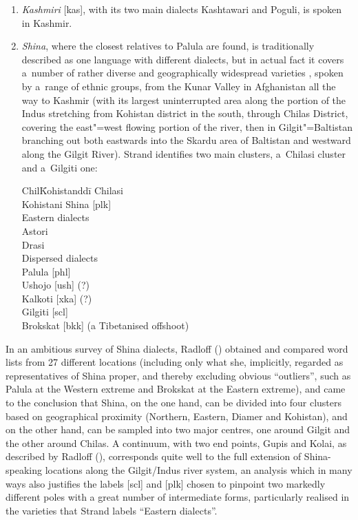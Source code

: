 \begin{enumerate}
\item \textit{Kashmiri} [kas], with its two main dialects Kashtawari and Poguli, is spoken in Kashmir. 


\item \textit{Shina}, where the closest relatives to Palula are found, is traditionally described as one language with different dialects, but in actual fact it covers a~number of rather diverse and geographically widespread varieties \citep[17]{schmidt1985}, spoken by a~range of ethnic groups, from the Kunar Valley in Afghanistan all the way to Kashmir (with its largest uninterrupted area along the portion of the Indus stretching from Kohistan district in the south, through Chilas District, covering the east"=west flowing portion of the river, then in Gilgit"=Baltistan branching out both eastwards into the Skardu area of Baltistan and westward along the Gilgit River). Strand identifies two main clusters, a~Chilasi cluster and a~Gilgiti one:

\begin{tabbing}
Chil\=Kohistanddi\=\kill
Chilasi \\
\>Kohistani Shina [plk] \\
\>Eastern dialects \\
\>\>Astori \\
\>\>Drasi \\
\>Dispersed dialects \\
\>\>Palula [phl] \\
\>\>Ushojo [ush] (?) \\
\>\>Kalkoti [xka] (?) \\
Gilgiti [scl] \\
\>Brokskat [bkk] (a Tibetanised offshoot) \\
\end{tabbing}
\end{enumerate}

In an ambitious survey of Shina dialects, Radloff (\citeyear{radloff1992}) obtained and compared word lists from 27 different locations (including only what she, implicitly, regarded as representatives of Shina proper, and thereby excluding obvious ``outliers'', such as Palula at the Western extreme and Brokskat at the Eastern extreme), and came to the conclusion that Shina, on the one hand, can be divided into four clusters based on geographical proximity (Northern, Eastern, Diamer and Kohistan), and on the other hand, can be sampled into two major centres, one around Gilgit and the other around Chilas. A continuum, with two end points, Gupis and Kolai, as described by Radloff (\citeyear[132]{radloff1992}), corresponds quite well to the full extension of Shina-speaking locations along the Gilgit/Indus river system, an analysis which in many ways also justifies the labels [scl] and [plk] chosen to pinpoint two markedly different poles with a great number of intermediate forms, particularly realised in the varieties that Strand labels ``Eastern dialects''.      


